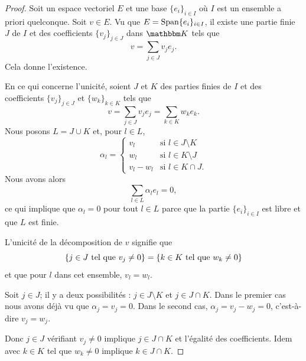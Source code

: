 \begin{proof}
    Soit un espace vectoriel \( E\) et une base \( \{ e_i \}_{i\in I}\) où \( I\) est un ensemble a priori quelconque. Soit \( v\in E\). Vu que \( E=\operatorname{Span}\{ e_i \}_{i\in I}\), il existe une partie finie \( J\) de \( I\) et des coefficients \( \{ v_j \}_{j\in J}\) dans \( \eK\) tels que
    \begin{equation}
        v=\sum_{j\in J}v_je_j.
    \end{equation}
    Cela donne l'existence.

    En ce qui concerne l'unicité, soient \( J \) et \( K\) des parties finies de \( I\) et des coefficients \( \{ v_j \}_{j\in J}\) et \( \{ w_{k} \}_{k\in K}\) tels que
    \begin{equation}
        v=\sum_{j\in J}v_je_j=\sum_{k\in K}w_{k}e_{k}.
    \end{equation}
    Nous posons \( L=J\cup K\) et, pour \( l\in L\),
    \begin{equation}
        \alpha_l=\begin{cases}
            v_l    &   \text{si } l\in J\setminus K\\
            w_l    &    \text{si } l\in K\setminus J\\
            v_l-w_l    &    \text{si } l\in K\cap J.
        \end{cases}
    \end{equation}
    Nous avons alors
    \begin{equation}
        \sum_{l\in L}\alpha_le_l=0,
    \end{equation}
    ce qui implique que \( \alpha_l=0\) pour tout \( l\in L\) parce que la partie \( \{ e_i \}_{i\in I}\) est libre et que \( L\) est finie.

    L'unicité de la décomposition de \( v\) signifie que
    \begin{equation}
        \{ j\in J \text{ tel que } v_j\neq 0 \}=\{ k\in K\text{ tel que } w_k\neq 0 \}
    \end{equation}
    et que pour \( l\) dans cet ensemble, \( v_l=w_l\).

    Soit \( j\in J\); il y a deux possibilités : \( j\in J\setminus K\) et \( j\in J\cap K\). Dans le premier cas nous avons déjà vu que \( \alpha_j=v_j=0\). Dans le second cas, \( \alpha_j=v_j-w_j=0\), c'est-à-dire \( v_j=w_j\).

    Donc \( j\in J\) vérifiant \( v_j\neq 0\) implique \( j\in J\cap K\) et l'égalité des coefficients. Idem avec \( k\in K\) tel que \( w_k\neq 0\) implique \( k\in J\cap K\).
\end{proof}

